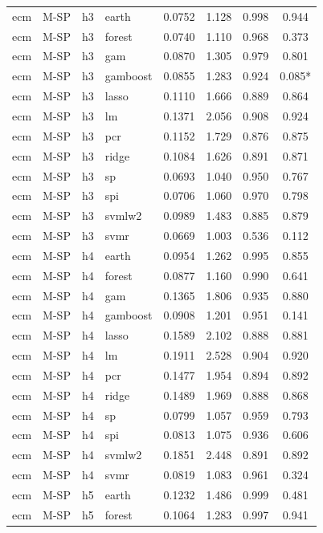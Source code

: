 \begin{ThreePartTable}
\begin{longtable}[t]{llclcccc}
\addlinespace
ecm & M-SP & h3 & earth & 0.0752 & 1.128 & 0.998 & 0.944\\
ecm & M-SP & h3 & forest & 0.0740 & 1.110 & 0.968 & 0.373\\
ecm & M-SP & h3 & gam & 0.0870 & 1.305 & 0.979 & 0.801\\
ecm & M-SP & h3 & gamboost & 0.0855 & 1.283 & 0.924 & 0.085*\\
ecm & M-SP & h3 & lasso & 0.1110 & 1.666 & 0.889 & 0.864\\
ecm & M-SP & h3 & lm & 0.1371 & 2.056 & 0.908 & 0.924\\
ecm & M-SP & h3 & pcr & 0.1152 & 1.729 & 0.876 & 0.875\\
ecm & M-SP & h3 & ridge & 0.1084 & 1.626 & 0.891 & 0.871\\
ecm & M-SP & h3 & sp & 0.0693 & 1.040 & 0.950 & 0.767\\
ecm & M-SP & h3 & spi & 0.0706 & 1.060 & 0.970 & 0.798\\
ecm & M-SP & h3 & svmlw2 & 0.0989 & 1.483 & 0.885 & 0.879\\
ecm & M-SP & h3 & svmr & 0.0669 & 1.003 & 0.536 & 0.112\\
\addlinespace
ecm & M-SP & h4 & earth & 0.0954 & 1.262 & 0.995 & 0.855\\
ecm & M-SP & h4 & forest & 0.0877 & 1.160 & 0.990 & 0.641\\
ecm & M-SP & h4 & gam & 0.1365 & 1.806 & 0.935 & 0.880\\
ecm & M-SP & h4 & gamboost & 0.0908 & 1.201 & 0.951 & 0.141\\
ecm & M-SP & h4 & lasso & 0.1589 & 2.102 & 0.888 & 0.881\\
ecm & M-SP & h4 & lm & 0.1911 & 2.528 & 0.904 & 0.920\\
ecm & M-SP & h4 & pcr & 0.1477 & 1.954 & 0.894 & 0.892\\
ecm & M-SP & h4 & ridge & 0.1489 & 1.969 & 0.888 & 0.868\\
ecm & M-SP & h4 & sp & 0.0799 & 1.057 & 0.959 & 0.793\\
ecm & M-SP & h4 & spi & 0.0813 & 1.075 & 0.936 & 0.606\\
ecm & M-SP & h4 & svmlw2 & 0.1851 & 2.448 & 0.891 & 0.892\\
ecm & M-SP & h4 & svmr & 0.0819 & 1.083 & 0.961 & 0.324\\
\addlinespace
ecm & M-SP & h5 & earth & 0.1232 & 1.486 & 0.999 & 0.481\\
ecm & M-SP & h5 & forest & 0.1064 & 1.283 & 0.997 & 0.941\\

\end{longtable}
\end{ThreePartTable}
